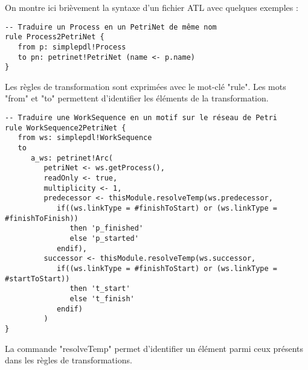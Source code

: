 On montre ici brièvement la syntaxe d'un fichier ATL avec quelques exemples :

\begin{lstlisting}
-- Traduire un Process en un PetriNet de même nom
rule Process2PetriNet {
   from p: simplepdl!Process
   to pn: petrinet!PetriNet (name <- p.name)
}
\end{lstlisting}

Les règles de transformation sont exprimées avec le mot-clé "rule".
Les mots "from" et "to" permettent d'identifier les éléments de la transformation.


\begin{lstlisting}
-- Traduire une WorkSequence en un motif sur le réseau de Petri
rule WorkSequence2PetriNet {
   from ws: simplepdl!WorkSequence
   to
      a_ws: petrinet!Arc(
         petriNet <- ws.getProcess(),
         readOnly <- true,
         multiplicity <- 1,
         predecessor <- thisModule.resolveTemp(ws.predecessor,
            if((ws.linkType = #finishToStart) or (ws.linkType = #finishToFinish))
               then 'p_finished'
               else 'p_started'
            endif),
         successor <- thisModule.resolveTemp(ws.successor,
            if((ws.linkType = #finishToStart) or (ws.linkType = #startToStart))
               then 't_start'
               else 't_finish'
            endif)
         )
}
\end{lstlisting}

La commande "resolveTemp" permet d'identifier un élément parmi ceux présents dans les règles de transformations.
